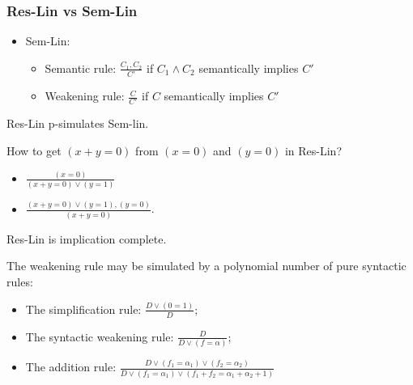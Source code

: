 \begin{frame}
    \frametitle{Res-Lin vs Sem-Lin}

    \begin{itemize}
		\item Sem-Lin:
			\begin{itemize}
				\item Semantic rule: $\frac{C_1, C_2}{C'}$ if $C_1 \land C_2$
		            semantically implies $C'$
				\item Weakening rule: $\frac{C}{C'}$ if $C$ semantically implies $C'$
			\end{itemize}
	\end{itemize}

	\pause\myth Res-Lin p-simulates Sem-lin.

	\pause\myex How to get $(x + y = 0)$ from $(x = 0)$ and $(y = 0)$ in Res-Lin?
    
	\begin{itemize}
		\item $\frac{(x = 0)}{(x + y = 0) \lor (y = 1)}$
		\item $\frac{(x + y = 0) \lor (y = 1),(y = 0)}{(x + y = 0)}$.
	\end{itemize}

	\pause
	\myth Res-Lin is implication complete.

	\begin{itemize}
		\pitem The weakening rule may be simulated by a polynomial number of pure
	        syntactic rules:
		\begin{itemize}
			\item The simplification rule: $\frac{D \lor (0 = 1)}{D}$; 
			\item The syntactic weakening rule: $\frac{D}{D \lor (f = \alpha)}$;
			\item The addition rule: $\frac{D \lor (f_1 = \alpha_1) \lor
		        (f_2 = \alpha_2)}{D \lor (f_1 = \alpha_1) \lor
                (f_1 + f_2 = \alpha_1 + \alpha_2 + 1)}$ 
		\end{itemize}
	\end{itemize}
\end{frame}



